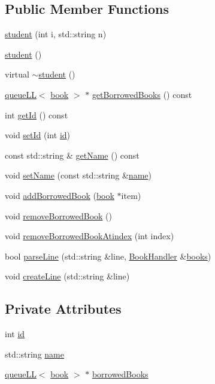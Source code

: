 \subsection*{Public Member Functions}
\begin{DoxyCompactItemize}
\item 
\hyperlink{classstudent_a12856a6274dafe06723815e464b6a336}{student} (int i, std\+::string n)
\item 
\hyperlink{classstudent_a9614bbb1bed8ee2aea8aab60fe58494b}{student} ()
\item 
virtual \hyperlink{classstudent_a102d321793438dd827305764bf59f86c}{$\sim$student} ()
\item 
\hyperlink{classqueue_l_l}{queue\+LL}$<$ \hyperlink{classbook}{book} $>$ $\ast$ \hyperlink{classstudent_a27120d590ee93cc80c5b9d72d91a2eb3}{get\+Borrowed\+Books} () const
\item 
int \hyperlink{classstudent_a718b1fdd02dd1ed06110f9e0e7ec7720}{get\+Id} () const
\item 
void \hyperlink{classstudent_abda32701d8741f07e9aa45d339a122ff}{set\+Id} (int \hyperlink{classstudent_a8215d11b0d1adc77e0808a0ff4d0f6a2}{id})
\item 
const std\+::string \& \hyperlink{classstudent_aeeeae15e9a049b1e0973f91bd55fd78b}{get\+Name} () const
\item 
void \hyperlink{classstudent_a9e5279d275d68557215edd499c15b0a2}{set\+Name} (const std\+::string \&\hyperlink{classstudent_a8bba46a454eaecf8619a68c4c38c7b8d}{name})
\item 
void \hyperlink{classstudent_af02c927727b890c189a4641f01185bcc}{add\+Borrowed\+Book} (\hyperlink{classbook}{book} $\ast$item)
\item 
void \hyperlink{classstudent_ab98c4cb9d85152c3abd2b5d4255b8271}{remove\+Borrowed\+Book} ()
\item 
void \hyperlink{classstudent_a5387f0131233065383ca141ddec50de6}{remove\+Borrowed\+Book\+Atindex} (int index)
\item 
bool \hyperlink{classstudent_a73c407020ea392b45dc9ff9babc0850b}{parse\+Line} (std\+::string \&line, \hyperlink{class_book_handler}{Book\+Handler} \&\hyperlink{_library_mananagement_system_8cpp_a2945b7618a199e1ba93546310a14a75a}{books})
\item 
void \hyperlink{classstudent_a4bc363a59fc8b14d81e8e5e0d2326444}{create\+Line} (std\+::string \&line)
\end{DoxyCompactItemize}
\subsection*{Private Attributes}
\begin{DoxyCompactItemize}
\item 
int \hyperlink{classstudent_a8215d11b0d1adc77e0808a0ff4d0f6a2}{id}
\item 
std\+::string \hyperlink{classstudent_a8bba46a454eaecf8619a68c4c38c7b8d}{name}
\item 
\hyperlink{classqueue_l_l}{queue\+LL}$<$ \hyperlink{classbook}{book} $>$ $\ast$ \hyperlink{classstudent_ab477f6c1525709586ea41364dc8c568b}{borrowed\+Books}
\end{DoxyCompactItemize}
